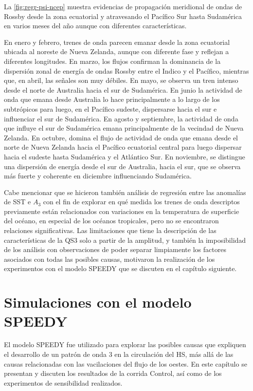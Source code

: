 \documentclass[spanish,a4paper,12pt,oneside]{book}
\begin{document}
La \autoref{fig:regr-psi-ncep} muestra evidencias de propagación
meridional de ondas de Rossby desde la zona ecuatorial y atravesando el
Pacífico Sur hasta Sudamérica en varios meses del año aunque con
diferentes características.

En enero y febrero, trenes de onda parecen emanar desde la zona
ecuatorial ubicada al noreste de Nueva Zelanda, aunque con diferente
fase y reflejan a diferentes longitudes. En marzo, los flujos confirman
la dominancia de la dispersión zonal de energía de ondas Rossby entre el
Indico y el Pacífico, mientras que, en abril, las señales son muy
débiles. En mayo, se observa un tren intenso desde el norte de Australia
hacia el sur de Sudamérica. En junio la actividad de onda que emana
desde Australia lo hace principalmente a lo largo de los subtrópicos
para luego, en el Pacífico sudeste, dispersarse hacia el sur e
influenciar el sur de Sudamérica. En agosto y septiembre, la actividad
de onda que influye el sur de Sudamérica emana principalmente de la
vecindad de Nueva Zelanda. En octubre, domina el flujo de actividad de
onda que emana desde el norte de Nueva Zelanda hacia el Pacífico
ecuatorial central para luego dispersar hacia el sudeste hasta
Sudamérica y el Atlántico Sur. En noviembre, se distingue una dispersión
de energía desde el sur de Australia, hacia el sur, que se observa más
fuerte y coherente en diciembre influenciando Sudamérica.

Cabe mencionar que se hicieron también análisis de regresión entre las
anomalías de SST e \(A_3\) con el fin de explorar en qué medida los
trenes de onda descriptos previamente están relacionados con variaciones
en la temperatura de superficie del océano, en especial de los océanos
tropicales, pero no se encontraron relaciones significativas. Las
limitaciones que tiene la descripción de las características de la QS3
solo a partir de la amplitud, y también la imposibilidad de los análisis
con observaciones de poder separar limpiamente los factores asociados
con todas las posibles causas, motivaron la realización de los
experimentos con el modelo SPEEDY que se discuten en el capítulo
siguiente.

\chapter{Simulaciones con el modelo
SPEEDY}\label{simulaciones-con-el-modelo-speedy}

El modelo SPEEDY fue utilizado para explorar las posibles causas que
expliquen el desarrollo de un patrón de onda 3 en la circulación del HS,
más allá de las causas relacionadas con las vacilaciones del flujo de
los oestes. En este capítulo se presentan y discuten los resultados de
la corrida Control, así como de los experimentos de sensibilidad
realizados.
\end{document}

